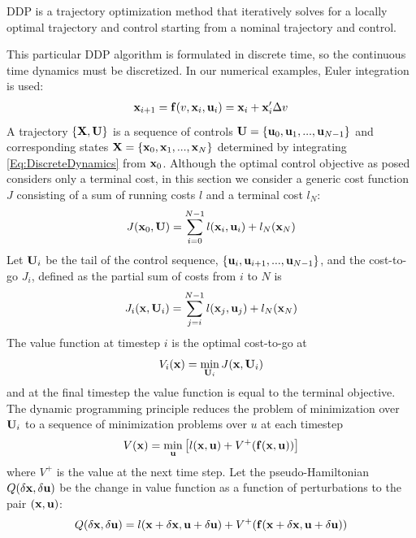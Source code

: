 DDP is a trajectory optimization method that iteratively solves for a locally optimal trajectory and control starting from a nominal trajectory and control.

This particular DDP algorithm is formulated in discrete time, so the continuous time dynamics must be discretized. In our numerical examples, Euler integration is used:
\begin{align}
	\mathbf{x}_{i+1} = \mathbf{f}(v, \mathbf{x}_i,\mathbf{u}_i) = \mathbf{x}_i + \mathbf{x}_i'\Delta v \label{Eq:DiscreteDynamics}
\end{align}
A trajectory $\{\mathbf{X},\mathbf{U}\}$ is a sequence of controls $ \mathbf{U}=\{\mathbf{u}_0,\mathbf{u}_1,...,\mathbf{u}_{N-1}\} $ and corresponding states $\mathbf{X}=\{\mathbf{x}_0,\mathbf{x}_1,...,\mathbf{x}_N\}$ determined by integrating \eqref{Eq:DiscreteDynamics} from $\mathbf{x}_0$.
Although the optimal control objective as posed considers only a terminal cost, in this section we consider a generic cost function $J$ consisting of a sum of running costs $l$ and a terminal cost $l_N$:
\begin{align}
	J(\mathbf{x}_0,\mathbf{U}) = \sum_{i=0}^{N-1}l(\mathbf{x}_i,\mathbf{u}_i) + l_N(\mathbf{x}_N)
\end{align}
Let $\mathbf{U}_i$ be the tail of the control sequence, $\{\mathbf{u}_i,\mathbf{u}_{i+1},...,\mathbf{u}_{N-1}\}$, and the cost-to-go $J_i$, defined as the partial sum of costs from $i$ to $N$ is
\begin{align}
	J_i(\mathbf{x},\mathbf{U}_i) = \sum_{j=i}^{N-1}l(\mathbf{x}_j,\mathbf{u}_j) + l_N(\mathbf{x}_N)
\end{align}
The value function at timestep $i$ is the optimal cost-to-go at \state
\begin{align}
	V_i(\mathbf{x}) = \min_{\mathbf{U}_i} J(\mathbf{x}, \mathbf{U}_i)
\end{align}
and at the final timestep the value function is equal to the terminal objective. The dynamic programming principle reduces the problem of minimization over $\mathbf{U}_i$ to a sequence of minimization problems over $u$ at each timestep 
\begin{align}
	V(\mathbf{x}) = \min_{\mathbf{u}}\left[l(\mathbf{x},\mathbf{u}) + V^+(\mathbf{f}(\mathbf{x},\mathbf{u}))\right] \label{eq_dynamic_programming}
\end{align}
where $V^+$ is the value at the next time step.
Let the pseudo-Hamiltonian $Q(\delta\mathbf{x},\delta\mathbf{u})$ be the change in value function as a function of perturbations to the pair $(\mathbf{x},\mathbf{u})$:
\begin{align}
	Q(\delta\mathbf{x},\delta\mathbf{u}) = l(\mathbf{x}+\delta\mathbf{x},\mathbf{u}+\delta\mathbf{u}) + V^+(\mathbf{f}(\mathbf{x}+\delta\mathbf{x},\mathbf{u}+\delta\mathbf{u}))
\end{align}
